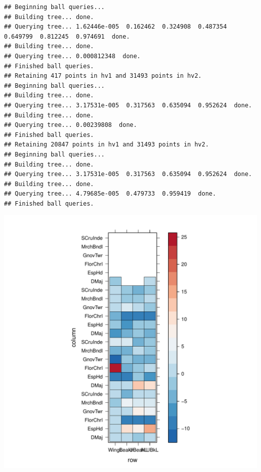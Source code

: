 \documentclass[12pt]{article}\usepackage[]{graphicx}\usepackage[]{color}
\makeatletter
\def\maxwidth{ %
  \ifdim\Gin@nat@width>\linewidth
    \linewidth
  \else
    \Gin@nat@width
  \fi
}
\newenvironment{kframe}{%
 \def\at@end@of@kframe{}%
 \ifinner\ifhmode%
  \def\at@end@of@kframe{\end{minipage}}%
  \begin{minipage}{\columnwidth}%
 \fi\fi%
 \def\FrameCommand##1{\hskip\@totalleftmargin \hskip-\fboxsep
 \colorbox{shadecolor}{##1}\hskip-\fboxsep
     \hskip-\linewidth \hskip-\@totalleftmargin \hskip\columnwidth}%
 \MakeFramed {\advance\hsize-\width
   \@totalleftmargin\z@ \linewidth\hsize
   \@setminipage}}%
 {\par\unskip\endMakeFramed%
 \at@end@of@kframe}
\newenvironment{knitrout}{}{} %
\makeatother
\begin{document}
\begin{knitrout}
\begin{kframe}
\begin{verbatim}
## Beginning ball queries... 
## Building tree... done.
## Querying tree... 1.62446e-005  0.162462  0.324908  0.487354  0.649799  0.812245  0.974691  done.
## Building tree... done.
## Querying tree... 0.000812348  done.
## Finished ball queries. 
## Retaining 417 points in hv1 and 31493 points in hv2.
## Beginning ball queries... 
## Building tree... done.
## Querying tree... 3.17531e-005  0.317563  0.635094  0.952624  done.
## Building tree... done.
## Querying tree... 0.00239808  done.
## Finished ball queries. 
## Retaining 20847 points in hv1 and 31493 points in hv2.
## Beginning ball queries... 
## Building tree... done.
## Querying tree... 3.17531e-005  0.317563  0.635094  0.952624  done.
## Building tree... done.
## Querying tree... 4.79685e-005  0.479733  0.959419  done.
## Finished ball queries.
\end{verbatim}
\end{kframe}
\includegraphics[width=\maxwidth]{figure/unnamed-chunk-561} 


\end{knitrout}
\end{document}
